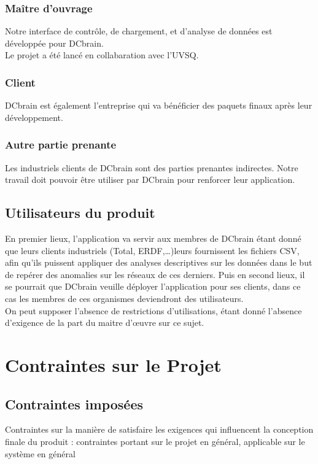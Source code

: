 			\subsubsection{Maître d'ouvrage}
			Notre interface de contrôle, de chargement, et d'analyse de données est développée pour DCbrain.\\
			Le projet a été lancé en collabaration avec l'UVSQ.
			
			\subsubsection{Client}
			DCbrain est également l'entreprise qui va bénéficier des paquets finaux après leur développement.
			
			\subsubsection{Autre partie prenante}
			Les industriels clients de DCbrain sont des parties prenantes indirectes. Notre travail doit pouvoir être utiliser par DCbrain pour renforcer leur application.
			
		\subsection{Utilisateurs du produit}
		En premier lieux, l’application va servir aux membres de DCbrain étant donné que leurs clients industriels (Total, ERDF,…)leurs fournissent les fichiers CSV, afin qu’ils puissent appliquer des analyses descriptives sur les données dans le but de repérer des anomalies sur les réseaux de ces derniers. Puis en second lieux, il se pourrait que DCbrain veuille déployer l'application pour ses clients, dans ce cas les membres de ces organismes deviendront des utilisateurs.\\
		
		On peut supposer l'absence de restrictions d'utilisations, étant donné l'absence d'exigence de la part du maitre d'œuvre sur ce sujet.

	\section{Contraintes sur le Projet}
		\subsection{Contraintes imposées}
		{\color{red}Contraintes sur la manière de satisfaire les exigences qui influencent la conception finale du produit : contraintes portant sur le projet en général, applicable sur le système en général}
